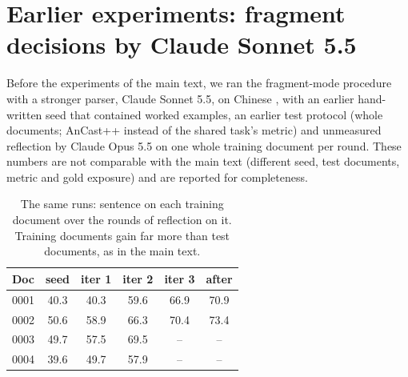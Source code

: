 \section{Earlier experiments: fragment decisions by Claude Sonnet 5.5}
\label{app:sonnet}

Before the experiments of the main text, we ran the fragment-mode \umr procedure with a stronger parser, Claude Sonnet 5.5, on Chinese \umr, with an earlier hand-written seed that contained worked examples, an earlier test protocol (whole documents; AnCast++ instead of the shared task's metric) and unmeasured reflection by Claude Opus 5.5 on one whole training document per round. These numbers are not comparable with the main text (different seed, test documents, metric and gold exposure) and are reported for completeness.

\begin{table}[h]
\centering\small
\setlength{\tabcolsep}{4pt}
\caption{Earlier Chinese \umr runs with Sonnet 5.5 fragment decisions (AnCast++ sentence-graph F and comprehensive score, macro-averaged over documents). $R_{xy}$: the version after round $y$ on training document $x$. ``n/a'': 0004 was a training document by then.}
\label{tab:sonnet}
\end{table}

\begin{table}[h]
\centering\small
\setlength{\tabcolsep}{4pt}
\begin{tabular}{@{}lccccc@{}}
\toprule
Doc & seed & iter 1 & iter 2 & iter 3 & after \\
\midrule
0001 & 40.3 & 40.3 & 59.6 & 66.9 & 70.9 \\
0002 & 50.6 & 58.9 & 66.3 & 70.4 & 73.4 \\
0003 & 49.7 & 57.5 & 69.5 & -- & -- \\
0004 & 39.6 & 49.7 & 57.9 & -- & -- \\
\bottomrule
\end{tabular}
\caption{The same runs: sentence \F on each training document over the rounds of reflection on it. Training documents gain far more than test documents, as in the main text.}
\label{tab:sonnet-traj}
\end{table}

